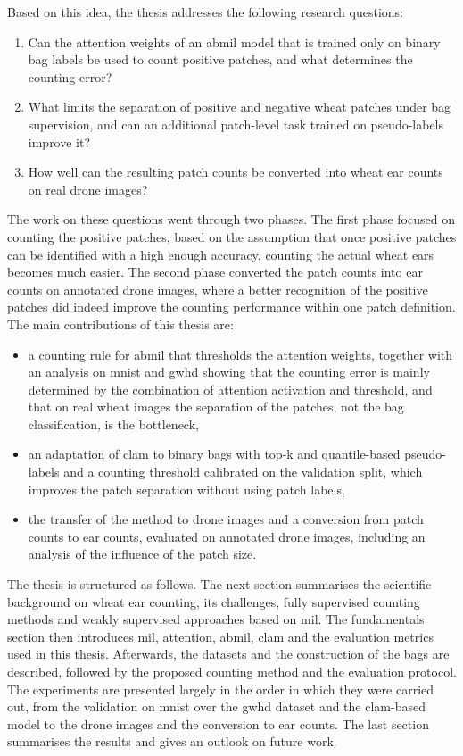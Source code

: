 \documentclass[12pt,parskip = half, DIV=classic,listof=totoc]{scrartcl}
\begin{document}
		Based on this idea, the thesis addresses the following research questions:
		\begin{enumerate}
			\item Can the attention weights of an \ac{abmil} model that is trained only on binary bag labels be used to 
			count positive patches, and what determines the counting error?
			\item What limits the separation of positive and negative wheat patches under bag supervision, and can an 
			additional patch-level task trained on pseudo-labels improve it?
			\item How well can the resulting patch counts be converted into wheat ear counts on real drone images?
		\end{enumerate}

		The work on these questions went through two phases. The first phase focused on counting the positive patches, 
		based on the assumption that once positive patches can be identified with a high enough accuracy, counting the 
		actual wheat ears becomes much easier. The second phase converted the patch counts into ear counts on annotated 
		drone images, where a better recognition of the positive patches did indeed improve the counting performance 
		within one patch definition. The main contributions of this thesis are:
		\begin{itemize}
			\item a counting rule for \ac{abmil} that thresholds the attention weights, together with an analysis on 
			\ac{mnist} and \ac{gwhd} showing that the counting error is mainly determined by the combination of attention 
			activation and threshold, and that on real wheat images the separation of the patches, not the bag 
			classification, is the bottleneck,
			\item an adaptation of \ac{clam} to binary bags with top-k and quantile-based pseudo-labels and a counting 
			threshold calibrated on the validation split, which improves the patch separation without using patch labels,
			\item the transfer of the method to drone images and a conversion from patch counts to ear counts, evaluated 
			on annotated drone images, including an analysis of the influence of the patch size.
		\end{itemize}

		The thesis is structured as follows. The next section summarises the scientific background on wheat ear 
		counting, its challenges, fully supervised counting methods and weakly supervised approaches based on \ac{mil}. 
		The fundamentals section then introduces \ac{mil}, attention, \ac{abmil}, \ac{clam} and the evaluation metrics 
		used in this thesis. Afterwards, the datasets and the construction of the bags are described, followed by the 
		proposed counting method and the evaluation protocol. The experiments are presented largely in the order in which they were carried out, from 
		the validation on \ac{mnist} over the \ac{gwhd} dataset and the \ac{clam}-based model to the drone images and 
		the conversion to ear counts. The last section summarises the results and gives an outlook on future work.
\end{document}
